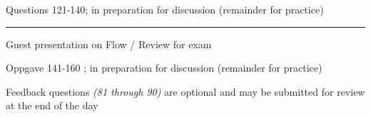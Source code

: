 \vskip 2pt \noindent Questions 121-140;  in preparation for discussion (remainder for practice)

\vskip 10pt




\filbreak
\hrule \vskip 5pt
\noindent {}

\vskip 5pt


\vskip 2pt  Guest presentation on Flow / Review for exam

\vskip 2pt \noindent Oppgave 141-160 ;  in preparation for discussion (remainder for practice)

\vskip 5pt

\noindent Feedback questions {\it (81 through 90)} are optional and may be submitted for review at the end of the day

\vskip 10pt

